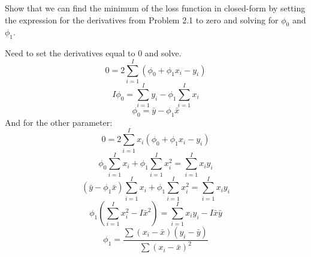 \documentclass[10pt]{article}
\begin{document}
Show that we can find the minimum of the loss function in closed-form by setting the expression for the derivatives from Problem 2.1 to zero and solving for $\phi_0$ and $\phi_1$.

\vspace{2em}

Need to set the derivatives equal to 0 and solve.
\[
0 = 2 \sum_{i=1}^I \left( \phi_0 + \phi_1 x_i - y_i \right)
\]
\[
I \phi_0 = \sum_{i=1}^I y_i - \phi_1 \sum_{i=1}^I x_i
\]
\[
\phi_0 = \bar{y} - \phi_1 \bar{x}
\]
And for the other parameter:
\[
0 = 2 \sum_{i=1}^I x_i \left( \phi_0 + \phi_1 x_i - y_i \right)
\]
\[
\phi_0 \sum_{i=1}^I x_i + \phi_1 \sum_{i=1}^I x_i^2 = \sum_{i=1}^I x_i y_i
\]
\[
(\bar{y} - \phi_1 \bar{x}) \sum_{i=1}^I x_i + \phi_1 \sum_{i=1}^I x_i^2 = \sum_{i=1}^I x_i y_i
\]
\[
\phi_1 \left( \sum_{i=1}^I x_i^2 - I \bar{x}^2 \right) = \sum_{i=1}^I x_i y_i - I \bar{x} \bar{y}
\]
\[
\phi_1 = \frac{\sum (x_i - \bar{x})(y_i - \bar{y})}{\sum (x_i - \bar{x})^2}
\]
\end{document}
